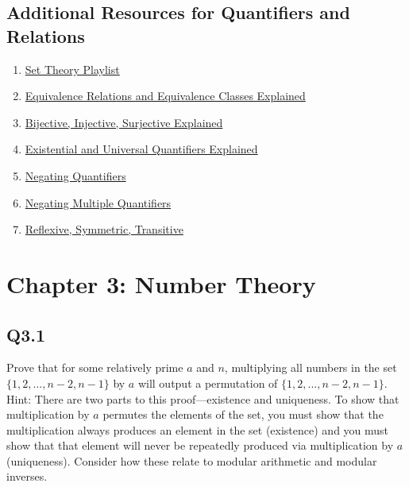 \documentclass{article}
\begin{document}
\subsection*{Additional Resources for Quantifiers and Relations}
\begin{enumerate}
    \item \href{https://www.youtube.com/watch?v=tyDKR4FG3Yw&list=PLDDGPdw7e6Ag1EIznZ-m-qXu4XX3A0cIz}{Set Theory Playlist}
    \item \href{https://www.youtube.com/watch?v=ZgcTX16borA}{Equivalence Relations and Equivalence Classes Explained}
    \item \href{https://www.youtube.com/watch?v=bZred_Ksz2k&t=6s}{Bijective, Injective, Surjective Explained}
    \item \href{https://www.youtube.com/watch?v=GJpezCUMOxA}{Existential and Universal Quantifiers Explained}
    \item \href{https://www.youtube.com/watch?v=q1rKFGSiZE8}{Negating Quantifiers}
    \item \href{https://www.youtube.com/watch?v=jLVKV5LJjaw}{Negating Multiple Quantifiers}
    \item \href{https://www.youtube.com/watch?v=6fwJj14O_TM}{Reflexive, Symmetric, Transitive}
\end{enumerate}
\newpage

\section*{Chapter 3: Number Theory}

\subsection*{Q3.1}
Prove that for some relatively prime $a$ and $n$, multiplying all numbers in the set $\{1,2,...,n-2,n-1\}$ by $a$ will output a permutation of $\{1,2,...,n-2,n-1\}$.
\\ Hint: There are two parts to this proof---existence and uniqueness. To show that multiplication by $a$ permutes the elements of the set, you must show that the multiplication always produces an element in the set (existence) and you must show that that element will never be repeatedly produced via multiplication by $a$ (uniqueness). Consider how these relate to modular arithmetic and modular inverses.
\newpage
\end{document}
